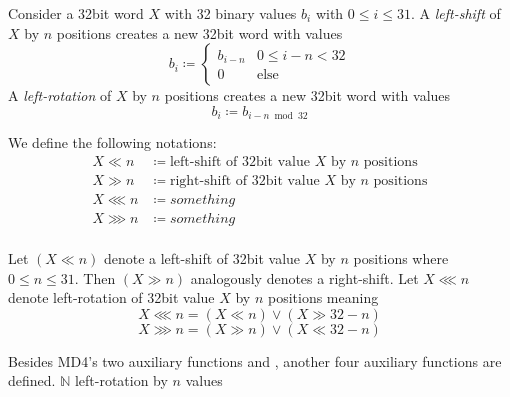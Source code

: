 \begin{defi}
  Consider a 32bit word $X$ with 32 binary values $b_i$ with $0 \leq i \leq 31$.
  A \emph{left-shift} of $X$ by $n$ positions creates a new 32bit word with values
  \[
    b_i \coloneqq \begin{cases}
      b_{i-n} & 0 \leq i-n < 32 \\
      0       & \text{else}
    \end{cases}
  \]
  A \emph{left-rotation} of $X$ by $n$ positions creates a new 32bit word with values
  \[ b_i \coloneqq b_{i-n \bmod{32}} \]

  We define the following notations:
  \begin{align*}
    X ≪ n &\coloneqq \text{left-shift of 32bit value } X \text{ by } n \text{ positions} \\
    X ≫ n &\coloneqq \text{right-shift of 32bit value } X \text{ by } n \text{ positions} \\
    X ⋘ n &\coloneqq something \\
    X ⋙ n &\coloneqq something \\
  \end{align*}

  Let $(X ≪ n)$ denote a left-shift of 32bit value $X$ by $n$ positions where $0 \leq n \leq 31$.
  Then $(X ≫ n)$ analogously denotes a right-shift. Let $X ⋘ n$ denote
  left-rotation of 32bit value $X$ by $n$ positions meaning
  \[ X ⋘ n = (X ≪ n) \lor (X ≫ 32 - n) \]
  \[ X ⋙ n = (X ≫ n) \lor (X ≪ 32 - n) \]
\end{defi}


Besides MD4's two auxiliary functions  and ,
another four auxiliary functions are defined.
$ \mathbb{N} $
left-rotation by $n$ values

%

